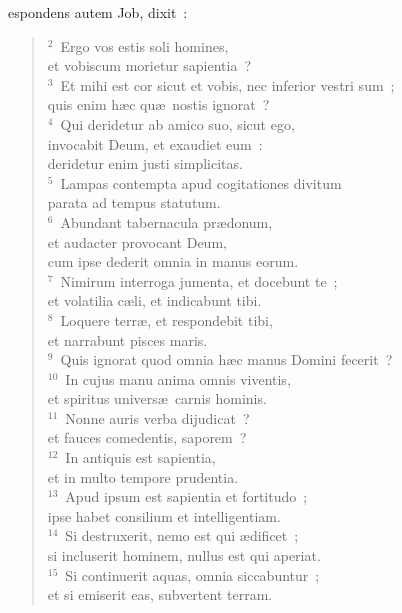 \bchapter
{}espondens autem Job, dixit~:
\begin{flushleft}\begin{verse}\vspace{6pt}${}^{2}$~Ergo vos estis soli homines,\\ et vobiscum morietur sapientia~?\\
${}^{3}$~Et mihi est cor sicut et vobis, nec inferior vestri sum~;\\ quis enim h\ae c qu\ae\ nostis ignorat~?\\
${}^{4}$~Qui deridetur ab amico suo, sicut ego,\\ invocabit Deum, et exaudiet eum~:\\ deridetur enim justi simplicitas.\\
${}^{5}$~Lampas contempta apud cogitationes divitum\\ parata ad tempus statutum.\\
${}^{6}$~Abundant tabernacula pr\ae donum,\\ et audacter provocant Deum,\\ cum ipse dederit omnia in manus eorum.\\
${}^{7}$~Nimirum interroga jumenta, et docebunt te~;\\ et volatilia c\ae li, et indicabunt tibi.\\
${}^{8}$~Loquere terr\ae , et respondebit tibi,\\ et narrabunt pisces maris.\\
${}^{9}$~Quis ignorat quod omnia h\ae c manus Domini fecerit~?\\
${}^{10}$~In cujus manu anima omnis viventis,\\ et spiritus univers\ae\ carnis hominis.\\
${}^{11}$~Nonne auris verba dijudicat~?\\ et fauces comedentis, saporem~?\\
${}^{12}$~In antiquis est sapientia,\\ et in multo tempore prudentia.\\
${}^{13}$~Apud ipsum est sapientia et fortitudo~;\\ ipse habet consilium et intelligentiam.\\
${}^{14}$~Si destruxerit, nemo est qui \ae dificet~;\\ si incluserit hominem, nullus est qui aperiat.\\
${}^{15}$~Si continuerit aquas, omnia siccabuntur~;\\ et si emiserit eas, subvertent terram.\\

\end{verse}
\end{flushleft}
